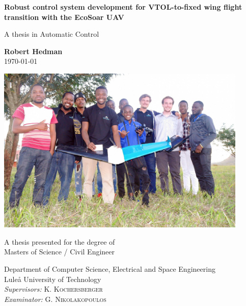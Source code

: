 \documentclass{article}
\begin{document}
\begin{titlepage}
    \begin{center}
 
        \huge
        \textbf{Robust control system development for VTOL-to-fixed wing flight transition with the EcoSoar UAV}
 
        \vspace{0.5cm}
        \LARGE
        A thesis in Automatic Control
 
        \vspace{1.5cm}
 
        \textbf{Robert Hedman\\}
        \today
        \vspace{0.6cm}

        \includegraphics[width=0.9\textwidth]{coverphoto.jpeg}
 
        \vfill
 
        A thesis presented for the degree of\\
        Masters of Science / Civil Engineer
 
        \vspace{0.6cm}
 
        \Large
        Department of Computer Science, Electrical and Space Engineering\\
        Luleå University of Technology\\
        \textit{Supervisors:} K. \textsc{Kochersberger}\\
        \textit{Examinator:} G. \textsc{Nikolakopoulos}

 
    \end{center}
\end{titlepage}
\end{document}
